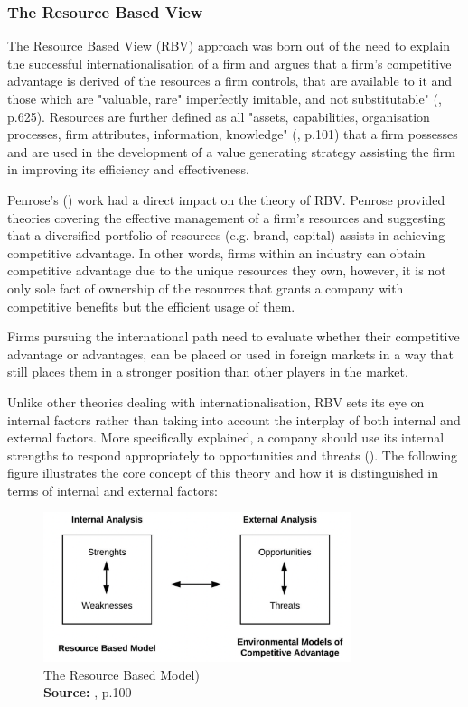 \documentclass[11pt,a4paper]{article}
\newcommand*{\captionsource}[2]{%
  \caption[{#1}]{%
    #1%
    \\\hspace{\linewidth}%
    \textbf{Source:} #2%
  }%
}
\begin{document}
{\subsubsection{The Resource Based View}
The Resource Based View (RBV) approach was born out of the need to explain the successful internationalisation of a firm and argues that a firm's competitive advantage is derived of the resources a firm controls, that are available to it and those which are "valuable, rare" imperfectly imitable, and not substitutable" (\cite{barneyResourcebasedViewFirm2001}, p.625). Resources are further defined as all "assets, capabilities, organisation processes, firm attributes, information, knowledge" (\cite{barneyFirmResourcesSustained1991}, p.101) that a firm possesses and are used in the development of a value generating strategy assisting the firm in improving its efficiency and effectiveness.  \par 
Penrose's (\citeyear{penroseTheoryGrowthFirm2009}) work had a direct impact on the theory of RBV.  Penrose provided theories covering the effective management of a firm's resources and suggesting that a diversified portfolio of resources (e.g. brand, capital) assists in achieving competitive advantage. In other words, firms within an industry can obtain competitive advantage due to the unique resources they own, however, it is not only sole fact of ownership of the resources that grants a company with competitive benefits but the efficient usage of them. \par
Firms pursuing the international path need to evaluate whether their competitive advantage or advantages, can be placed or used in foreign markets in a way that still places them in a stronger position than other players in the market. \par
Unlike other theories dealing with internationalisation, RBV sets its eye on internal factors rather than taking into account the interplay of both internal and external factors. More specifically explained, a company should use its internal strengths to respond appropriately to opportunities and threats (\cite{barneyFirmResourcesSustained1991}). The following figure illustrates the core concept of this theory and how it is distinguished in terms of internal and external factors:

  \vspace{5mm}
\begin{figure}[H]
	\centering
  \includegraphics[width=90mm]{figures/fig5_rbv_model}
  \vspace{5mm}
    \captionsetup{justification=centering,margin=2cm}
      \captionsource{The Resource Based Model)}{\cite{barneyFirmResourcesSustained1991}, p.100}
	\label{fig:rbv_model}
\end{figure}

}
\end{document}
